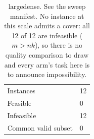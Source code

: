 \begin{table}[tb]
\centering
\caption{largedense. See the sweep manifest. No instance at this scale admits a cover: all 12 of 12 are infeasible ($m > nk$), so there is no quality comparison to draw and every arm's task here is to announce impossibility.}
\label{tab:cmp-largedense}
\begin{tabular}{ll}
\toprule
Instances & 12 \\
Feasible & 0 \\
Infeasible & 12 \\
Common valid subset & 0 \\
\bottomrule
\end{tabular}
\end{table}
